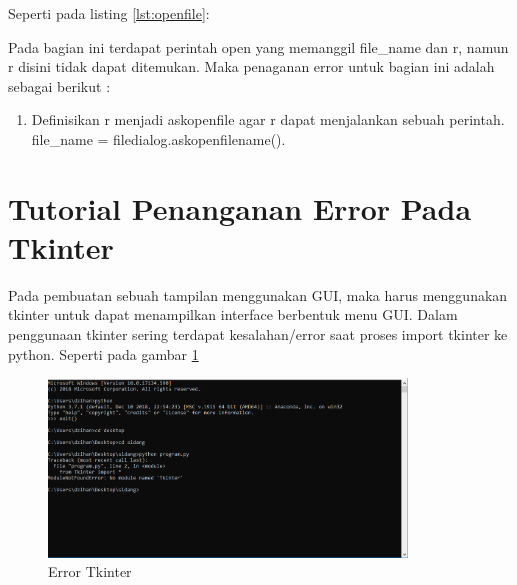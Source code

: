 Seperti pada listing \ref{lst:openfile}:

	
Pada bagian ini terdapat perintah open yang memanggil file\_name dan r, namun r disini tidak dapat ditemukan. Maka penaganan error untuk bagian ini adalah sebagai berikut :
\begin{enumerate}	
\item Definisikan r menjadi askopenfile agar r dapat menjalankan sebuah perintah. file\_name = filedialog.askopenfilename().
\end{enumerate}

\section{Tutorial Penanganan Error Pada Tkinter}
Pada pembuatan sebuah tampilan menggunakan GUI, maka harus menggunakan tkinter untuk dapat menampilkan interface berbentuk menu GUI. Dalam penggunaan tkinter sering terdapat kesalahan/error saat proses import tkinter ke python. Seperti pada gambar \ref{fig:errortkinter}
\begin{figure}[!htbp]
	\centerline{\includegraphics[width=0.85\textwidth]{figures/3/errortkinter.PNG}}
	\caption{Error Tkinter}
	\label{fig:errortkinter}
\end{figure}

